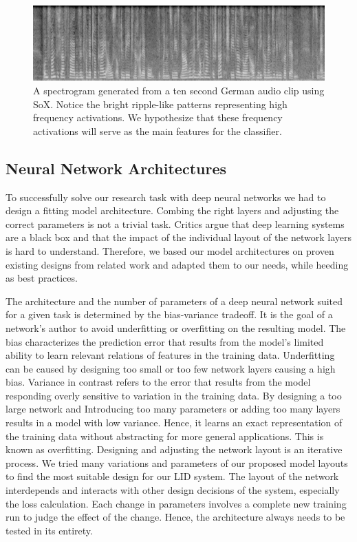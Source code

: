 	
	\begin{figure}[]
  		\centering
    	\includegraphics[width=\textwidth,keepaspectratio]{img/spectrogram.png}
    	\caption{A spectrogram generated from a ten second German audio clip  using SoX. Notice the bright ripple-like patterns representing high frequency activations. We hypothesize that these frequency activations will serve as the main features for the classifier.}
    	\label{fig:spectrogram}
	\end{figure}
	

\subsection{Neural Network Architectures}
\label{sec:cnn_architecture}
To successfully solve our research task with deep neural networks we had to design a fitting model architecture. Combing the right layers and adjusting the correct parameters is not a trivial task. Critics argue that deep learning systems are a black box and that the impact of the individual layout of the network layers is hard to understand. Therefore, we based our model architectures on proven existing designs from related work and adapted them to our needs, while heeding as best practices\cite{szegedy2016rethinking}\cite{mishkin2016systematic}.

The architecture and the number of parameters of a deep neural network suited for a given task is determined by the bias-variance tradeoff.\cite{geman1992neural} It is the goal of a network's author to avoid underfitting or overfitting on the resulting model. The bias characterizes the prediction error that results from the model's limited ability to learn relevant relations of features in the training data. Underfitting can be caused by designing too small or too few network layers causing a high bias. Variance in contrast refers to the error that results from the model responding overly sensitive to variation in the training data. By designing a too large network and Introducing too many parameters or adding too many layers results in a model with low variance. Hence, it learns an exact representation of the training data without abstracting for more general applications. This is known as overfitting.
Designing and adjusting the network layout is an iterative process. We tried many variations and parameters of our proposed model layouts to find the most suitable design for our LID system. The layout of the network interdepends and interacts with other design decisions of the system, especially the loss calculation. Each change in parameters involves a complete new training run to judge the effect of the change. Hence, the architecture always needs to be tested in its entirety. 

